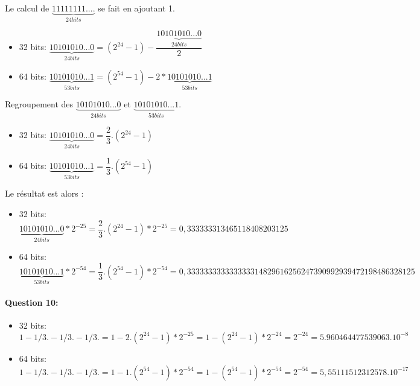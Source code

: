 Le calcul de $\underbrace{11111111....}_{24 bits}$ se fait en ajoutant 1.

\begin{itemize}
 \item 32 bits: $\underbrace{10101010...0}_{24 bits}=(2^{24}-1)-\dfrac{\underbrace{10101010...0}_{24 bits}}{2}$
 \item 64 bits: $\underbrace{10101010...1}_{53 bits}=(2^{54}-1)-2*\underbrace{10101010...1}_{53 bits}$
\end{itemize}

Regroupement des $\underbrace{10101010...0}_{24 bits}$ et $\underbrace{10101010...1}_{53 bits}$.

\begin{itemize}
 \item 32 bits: $\underbrace{10101010...0}_{24 bits}=\dfrac{2}{3}.(2^{24}-1)$
 \item 64 bits: $\underbrace{10101010...1}_{53 bits}=\dfrac{1}{3}.(2^{54}-1)$
\end{itemize}

Le résultat est alors :

\begin{itemize}
 \item 32 bits: $\underbrace{10101010...0}_{24 bits}*2^{-25}=\dfrac{2}{3}.(2^{24}-1)*2^{-25}=0,333333313465118408203125$
 \item 64 bits: $\underbrace{10101010...1}_{53 bits}*2^{-54}=\dfrac{1}{3}.(2^{54}-1)*2^{-54}=0,333333333333333314829616256247390992939472198486328125$
\end{itemize}

\paragraph{Question 10:}
\begin{itemize}
 \item 32 bits: $1-1/3.-1/3.-1/3.=1-2.(2^{24}-1)*2^{-25}=1-(2^{24}-1)*2^{-24}=2^{-24}=5.960464477539063.10^{-8}$
 \item 64 bits: $1-1/3.-1/3.-1/3.=1-1.(2^{54}-1)*2^{-54}=1-(2^{54}-1)*2^{-54}=2^{-54}=5,55111512312578.10^{-17}$
\end{itemize}


